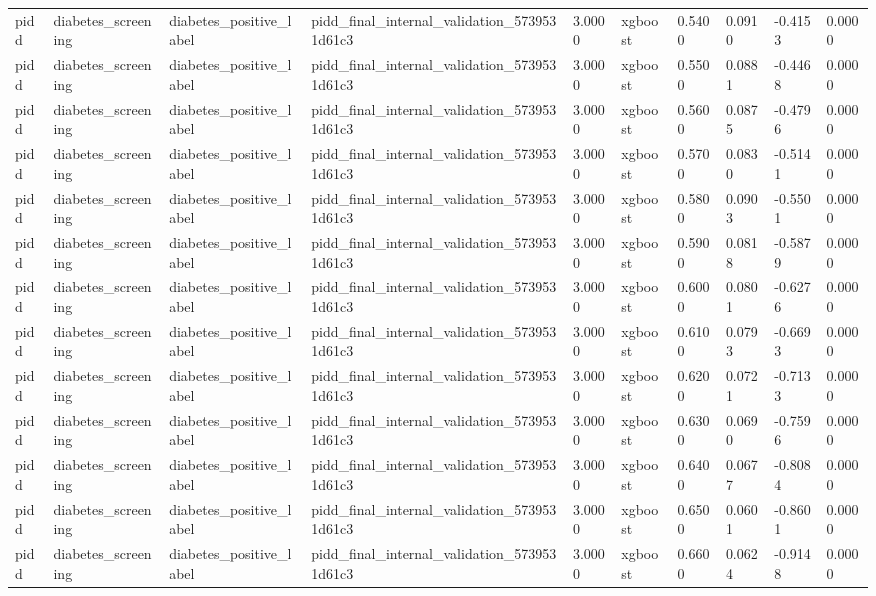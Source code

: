 \begin{tabular}{llllllllll}
pidd & diabetes\_screening & diabetes\_positive\_label & pidd\_final\_internal\_validation\_5739531d61c3 & 3.0000 & xgboost & 0.5400 & 0.0910 & -0.4153 & 0.0000 \\
pidd & diabetes\_screening & diabetes\_positive\_label & pidd\_final\_internal\_validation\_5739531d61c3 & 3.0000 & xgboost & 0.5500 & 0.0881 & -0.4468 & 0.0000 \\
pidd & diabetes\_screening & diabetes\_positive\_label & pidd\_final\_internal\_validation\_5739531d61c3 & 3.0000 & xgboost & 0.5600 & 0.0875 & -0.4796 & 0.0000 \\
pidd & diabetes\_screening & diabetes\_positive\_label & pidd\_final\_internal\_validation\_5739531d61c3 & 3.0000 & xgboost & 0.5700 & 0.0830 & -0.5141 & 0.0000 \\
pidd & diabetes\_screening & diabetes\_positive\_label & pidd\_final\_internal\_validation\_5739531d61c3 & 3.0000 & xgboost & 0.5800 & 0.0903 & -0.5501 & 0.0000 \\
pidd & diabetes\_screening & diabetes\_positive\_label & pidd\_final\_internal\_validation\_5739531d61c3 & 3.0000 & xgboost & 0.5900 & 0.0818 & -0.5879 & 0.0000 \\
pidd & diabetes\_screening & diabetes\_positive\_label & pidd\_final\_internal\_validation\_5739531d61c3 & 3.0000 & xgboost & 0.6000 & 0.0801 & -0.6276 & 0.0000 \\
pidd & diabetes\_screening & diabetes\_positive\_label & pidd\_final\_internal\_validation\_5739531d61c3 & 3.0000 & xgboost & 0.6100 & 0.0793 & -0.6693 & 0.0000 \\
pidd & diabetes\_screening & diabetes\_positive\_label & pidd\_final\_internal\_validation\_5739531d61c3 & 3.0000 & xgboost & 0.6200 & 0.0721 & -0.7133 & 0.0000 \\
pidd & diabetes\_screening & diabetes\_positive\_label & pidd\_final\_internal\_validation\_5739531d61c3 & 3.0000 & xgboost & 0.6300 & 0.0690 & -0.7596 & 0.0000 \\
pidd & diabetes\_screening & diabetes\_positive\_label & pidd\_final\_internal\_validation\_5739531d61c3 & 3.0000 & xgboost & 0.6400 & 0.0677 & -0.8084 & 0.0000 \\
pidd & diabetes\_screening & diabetes\_positive\_label & pidd\_final\_internal\_validation\_5739531d61c3 & 3.0000 & xgboost & 0.6500 & 0.0601 & -0.8601 & 0.0000 \\
pidd & diabetes\_screening & diabetes\_positive\_label & pidd\_final\_internal\_validation\_5739531d61c3 & 3.0000 & xgboost & 0.6600 & 0.0624 & -0.9148 & 0.0000 \\

\end{tabular}
